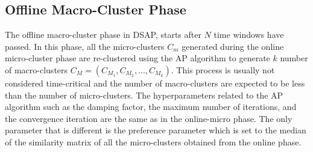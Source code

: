 \begin{itemize}[leftmargin=*]



\end{itemize}


\subsection{Offline Macro-Cluster Phase}

The offline macro-cluster phase in DSAP, starts after $N$ time windows have passed. In this phase, all the micro-clusters $C_m$ generated during the online micro-cluster phase are re-clustered using the AP algorithm to generate $k$ number of macro-clusters $C_M = (C_{M_1}, C_{M_2}, ..., C_{M_k})$. This process is usually not considered time-critical and the number of macro-clusters are expected to be less than the number of micro-clusters. The hyperparameters related to the AP algorithm such as the damping factor, the maximum number of iterations, and the convergence iteration are the same as in the online-micro phase. The only parameter that is different is the preference parameter which is set to the median of the similarity matrix of all the micro-clusters obtained from the online phase.







